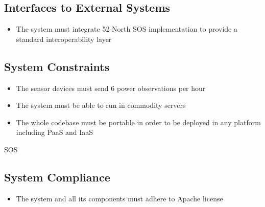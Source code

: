 \subsection*{Interfaces to External Systems}

\begin{itemize}
	\item The system must integrate 52 North SOS implementation to provide a standard interoperability layer
\end{itemize}

\subsection*{System Constraints}

\begin{itemize}
	\item The sensor devices must send 6 power observations per hour
	\item The system must be able to run in commodity servers 
	\item The whole codebase must be portable in order to be deployed in any platform including PaaS and IaaS
\end{itemize}

SOS

\subsection*{System Compliance}

\begin{itemize}
	\item The system and all its components must adhere to Apache license
\end{itemize}




